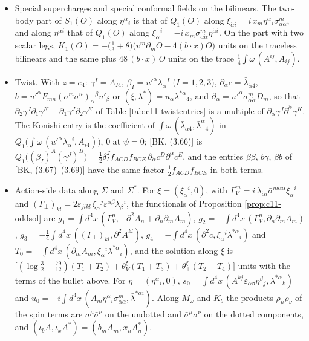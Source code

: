 \begin{remark}
\begin{itemize}
\item Special supercharges and special conformal fields on the bilinears. The two-body part of $S_1(O)$ along $\eta^\alpha{}_i$ is that of $\bar Q_1(O)$ along $\bar\xi_{\dot\alpha i}=i\,x_m\eta^\alpha{}_i\sigma^m_{\alpha\dot\alpha}$, and along $\bar\eta^{\dot\alpha i}$ that of $Q_1(O)$ along $\xi_\alpha{}^i=-i\,x_m\sigma^m_{\alpha\dot\alpha}\bar\eta^{\dot\alpha i}$. On the part with two scalar legs, $K_1(O)=-\big(\tfrac13+\theta\big)\big(v^m\partial_mO-4(b\cdot x)O\big)$ units on the traceless bilinears and the same plus $48\,(b\cdot x)\,O$ units on the trace $\tfrac14\int\omega\,(A^{ij},A_{ij})$.
\item Twist. With $z=e_4$: $\gamma^I=A_{I4}$, $\beta_I=u'^\alpha\lambda_\alpha{}^I$ ($I=1,2,3$), $\partial_{\dot\alpha}c=\bar\lambda_{\dot\alpha4}$, $b=u'^\alpha F_{mn}(\sigma^m\bar\sigma^n)_\alpha{}^\beta u'_\beta$ or $(\xi,\lambda^*)=u_\alpha\lambda^{*\alpha}{}_4$, and $\partial_{\dot\alpha}=u'^\alpha\sigma^m_{\alpha\dot\alpha}D_m$, so that $\partial_2\gamma^J\partial_1\gamma^K-\partial_1\gamma^J\partial_2\gamma^K$ of Table \ref{tab:c11-twistentries} is a multiple of $\partial_{\dot\alpha}\gamma^J\partial^{\dot\alpha}\gamma^K$. The Konishi entry is the coefficient of $\int\omega\,(\bar\lambda_{\dot\alpha4},\bar\lambda^{\dot\alpha}{}_4)$ in $Q_1\big(\int\omega\,(u'^\alpha\lambda_\alpha{}^i,A_{i4})\big)$, $0$ at $\psi=0$; [BK, (3.66)] is $Q_1\big((\beta_I)^A(\gamma^J)^B\big)=\tfrac12\delta^J_If_{ACD}f_{BCE}\,\partial_{\dot\alpha}c^D\partial^{\dot\alpha}c^E$, and the entries $\beta\beta$, $b\gamma$, $\beta b$ of [BK, (3.67)--(3.69)] have the same factor $\tfrac12f_{ACD}f_{BCE}$ in both terms.
\item Action-side data along $\Sigma$ and $\Sigma^*$. For $\xi=(\xi_\alpha{}^i,0)$, with $\Gamma_V^m=i\,\bar\lambda_{\dot\alpha i}\bar\sigma^{m\dot\alpha\alpha}\xi_\alpha{}^i$ and $(\Gamma_\perp)_{kl}=2\varepsilon_{jikl}\,\xi_\alpha{}^j\varepsilon^{\alpha\beta}\lambda_\beta{}^i$, the functionals of Proposition \ref{prop:c11-oddsol} are $g_1=\int d^4x\,(\Gamma_V^n,-\partial^2A_n+\partial_n\partial_mA_m)$, $g_2=-\int d^4x\,(\Gamma_V^n,\partial_n\partial_mA_m)$, $g_3=-\tfrac14\int d^4x\,((\Gamma_\perp)_{kl},\partial^2A^{kl})$, $g_4=-\int d^4x\,(\partial^2c,\xi_\alpha{}^i\lambda^{*\alpha}{}_i)$ and $T_0=-\int d^4x\,(\partial_mA_m,\xi_\alpha{}^i\lambda^{*\alpha}{}_i)$, and the solution along $\xi$ is $\big[(\log\tfrac32-\tfrac{79}{12})(T_1+T_2)+\theta^\xi_V(T_1+T_3)+\theta^\xi_\perp(T_2+T_4)\big]$ units with the terms of the bullet above. For $\eta=(\eta^\alpha{}_i,0)$, $s_0=\int d^4x\,(A^{kj}\varepsilon_{\alpha\beta}\eta^\beta{}_j,\lambda^{*\alpha}{}_k)$ and $u_0=-i\int d^4x\,(A_m\eta^\alpha{}_i\sigma^m_{\alpha\dot\alpha},\bar\lambda^{*\dot\alpha i})$. Along $M_\omega$ and $K_b$ the products $\rho_\mu\rho_\nu$ of the spin terms are $\sigma^\mu\bar\sigma^\nu$ on the undotted and $\bar\sigma^\mu\sigma^\nu$ on the dotted components, and $(\iota_bA,\iota_xA^*)=(b_mA_m,x_nA^*_n)$.

\end{itemize}
\end{remark}
